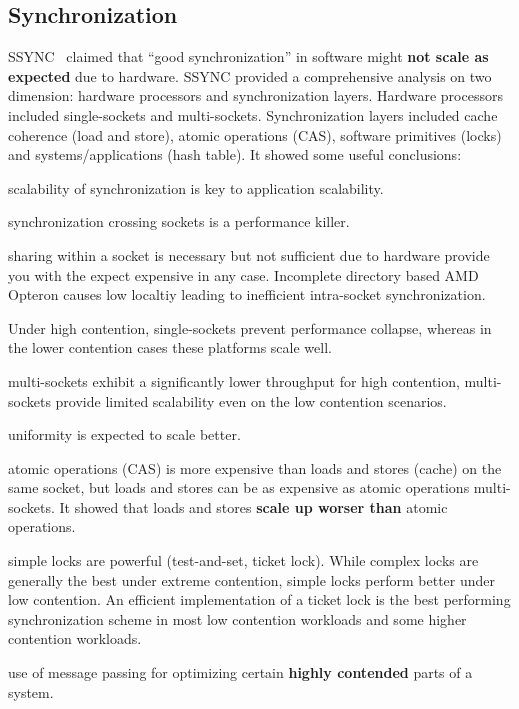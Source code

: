 \documentclass[UTF8,12pt,a4paper]{article}
\begin{document}
\subsection{Synchronization}
SSYNC~\cite{DBLP:conf/sosp/DavidGT13} claimed that
``good synchronization'' in software might \textbf{not scale as expected} due to hardware.
SSYNC provided a comprehensive analysis on two dimension:
hardware processors and synchronization layers.
Hardware processors included single-sockets and multi-sockets.
Synchronization layers included cache coherence (load and store),
atomic operations (CAS), software primitives (locks)
and systems/applications (hash table).
It showed some useful conclusions:
\begin{compactitem}
  \item scalability of synchronization is key to application scalability.
  \item synchronization crossing sockets is a performance killer.
  \item sharing within a socket is necessary but not sufficient
  due to hardware provide you with the expect expensive in any case.
  Incomplete directory based AMD Opteron causes low localtiy
  leading to inefficient intra-socket synchronization.
  \item Under high contention, single-sockets prevent performance collapse,
  whereas in the lower contention cases these platforms scale well.
  \item multi-sockets exhibit a significantly lower throughput for high contention,
  multi-sockets provide limited scalability even on the low contention scenarios.
  \item uniformity is expected to scale better.
  \item atomic operations (CAS) is more expensive than loads and stores (cache) on the same socket,
  but loads and stores can be as expensive as atomic operations multi-sockets.
  It showed that loads and stores \textbf{scale up worser than} atomic operations.
  \item simple locks are powerful (test-and-set, ticket lock).
  While complex locks are generally the best under extreme contention,
  simple locks perform better under low contention.
  An efficient implementation of a ticket lock is the best performing synchronization scheme
  in most low contention workloads and some higher contention workloads.
  \item use of message passing for optimizing certain \textbf{highly contended} parts of a system.
\end{compactitem}
\end{document}

